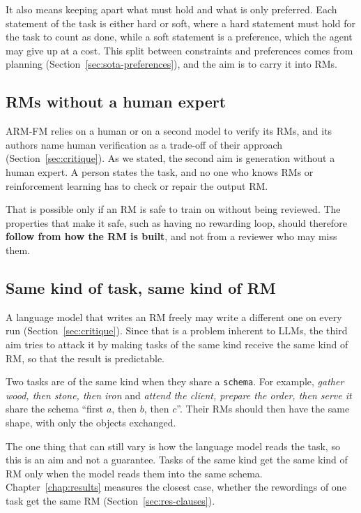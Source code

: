 \documentclass[11pt,english,listoffigures,listoftables]{tfgetsinf}
\begin{document}
It also means keeping apart what must hold and what is only preferred. Each statement of the task is either hard or soft, where a hard statement must hold for the task to count as done, while a soft statement is a preference, which the agent may give up at a cost. This split between constraints and preferences comes from planning (Section~\ref{sec:sota-preferences}), and the aim is to carry it into RMs.

\subsection{RMs without a human expert}
ARM-FM relies on a human or on a second model to verify its RMs, and its authors name human verification as a trade-off of their approach (Section~\ref{sec:critique}). As we stated, the second aim is generation without a human expert. A person states the task, and no one who knows RMs or reinforcement learning has to check or repair the output RM.

That is possible only if an RM is safe to train on without being reviewed. The properties that make it safe, such as having no rewarding loop, should therefore \textbf{follow from how the RM is built}, and not from a reviewer who may miss them.

\subsection{Same kind of task, same kind of RM}
\label{sec:schemas}
A language model that writes an RM freely may write a different one on every run (Section~\ref{sec:critique}). Since that is a problem inherent to LLMs, the third aim tries to attack it by making tasks of the same kind receive the same kind of RM, so that the result is predictable.

Two tasks are of the same kind when they share a \texttt{schema}. For example, \textit{gather wood, then stone, then iron} and \textit{attend the client, prepare the order, then serve it} share the schema ``first $a$, then $b$, then $c$''. Their RMs should then have the same shape, with only the objects exchanged.

The one thing that can still vary is how the language model reads the task, so this is an aim and not a guarantee. Tasks of the same kind get the same kind of RM only when the model reads them into the same schema. Chapter~\ref{chap:results} measures the closest case, whether the rewordings of one task get the same RM (Section~\ref{sec:res-clauses}).
\end{document}
